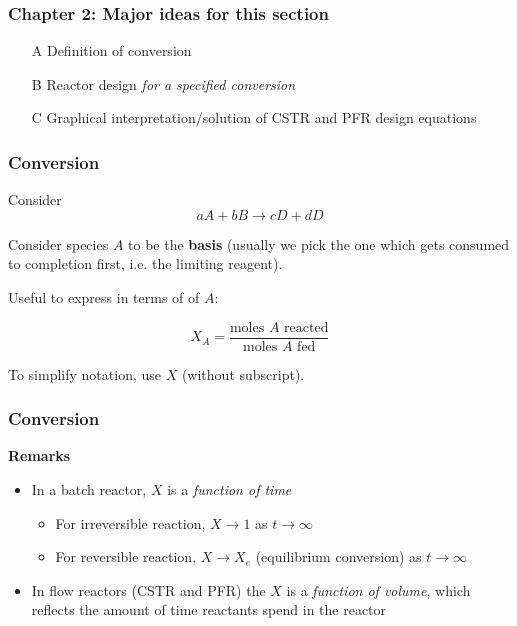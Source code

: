 \begin{frame}\frametitle{\textbf{Chapter 2}: Major ideas for this section}
	\begin{itemize}
		\item[A] Definition of conversion
		\item[B] Reactor design \emph{for a specified conversion}
		\item[C] Graphical interpretation/solution of CSTR and PFR design equations
	\end{itemize}
\end{frame}

\begin{frame}\frametitle{Conversion}
	Consider $$aA + bB \longrightarrow cD + dD$$

	Consider species $A$ to be the \textbf{basis} (usually we pick the one which gets consumed to completion first, i.e. the limiting reagent). 
	
	\vspace{12pt}
	
	Useful to express {\color{purple}{extent of reaction}} in terms of {} of $A$: 
	
	$$X_A = \frac{\text{moles }A\text{ reacted}}{\text{moles } A\text{ fed}}$$ 
	
	\vspace{12pt}
	{\small To simplify notation, use $X$ (without subscript).}
\end{frame}

\begin{frame}\frametitle{Conversion}
	\textbf{Remarks}
	\begin{itemize}
		\item	In a batch reactor, $X$ is a \emph{function of time}
		\begin{itemize}
			\item	For irreversible reaction, $X\rightarrow1$ as $t\rightarrow\infty$
			\item	For reversible reaction, $X\rightarrow X_e$ (equilibrium conversion) as $t\rightarrow\infty$
		\end{itemize}
		\vspace{12pt}
		\item	In flow reactors (CSTR and PFR) the $X$ is a \emph{function of volume}, which reflects the amount of time reactants spend in the reactor
	\end{itemize}
\end{frame}

